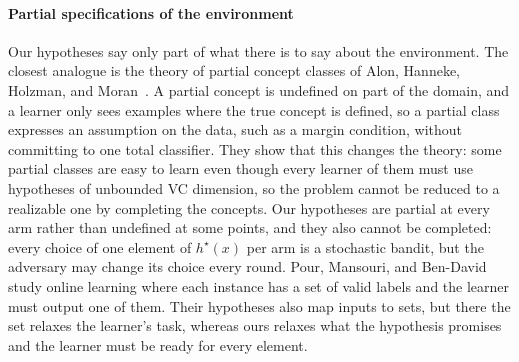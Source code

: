 {\paragraph{Partial specifications of the environment} Our hypotheses say only part of what there is to say about the environment. The closest analogue is the theory of partial concept classes of Alon, Hanneke, Holzman, and Moran~\citep{alon2021theory}. A partial concept is undefined on part of the domain, and a learner only sees examples where the true concept is defined, so a partial class expresses an assumption on the data, such as a margin condition, without committing to one total classifier. They show that this changes the theory: some partial classes are easy to learn even though every learner of them must use hypotheses of unbounded VC dimension, so the problem cannot be reduced to a realizable one by completing the concepts. Our hypotheses are partial at every arm rather than undefined at some points, and they also cannot be completed: every choice of one element of $h^{\star} \left( x \right)$ per arm is a stochastic bandit, but the adversary may change its choice every round. Pour, Mansouri, and Ben-David~\citep{pour2026learning} study online learning where each instance has a set of valid labels and the learner must output one of them. Their hypotheses also map inputs to sets, but there the set relaxes the learner's task, whereas ours relaxes what the hypothesis promises and the learner must be ready for every element.

}
